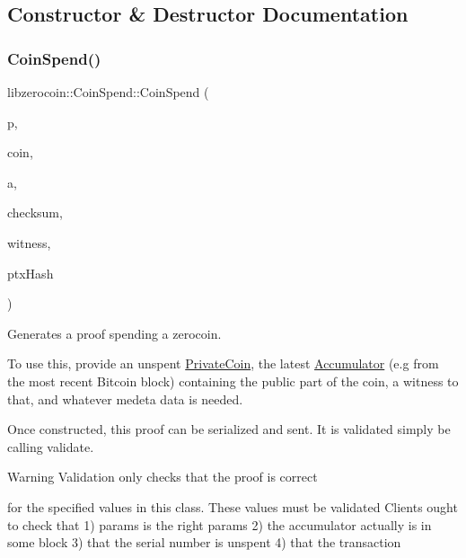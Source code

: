 \subsection{Constructor \& Destructor Documentation}
\mbox{\label{classlibzerocoin_1_1_coin_spend_ab26a001c08285be91ca2bf1d310d3cd6}} 
\subsubsection{\texorpdfstring{Coin\+Spend()}{CoinSpend()}}
{\footnotesize\ttfamily libzerocoin\+::\+Coin\+Spend\+::\+Coin\+Spend (\begin{DoxyParamCaption}\item[{const \mbox{\hyperlink{classlibzerocoin_1_1_zerocoin_params}{Zerocoin\+Params}} $\ast$}]{p,  }\item[{const \mbox{\hyperlink{classlibzerocoin_1_1_private_coin}{Private\+Coin}} \&}]{coin,  }\item[{\mbox{\hyperlink{classlibzerocoin_1_1_accumulator}{Accumulator}} \&}]{a,  }\item[{const uint32\+\_\+t}]{checksum,  }\item[{const \mbox{\hyperlink{classlibzerocoin_1_1_accumulator_witness}{Accumulator\+Witness}} \&}]{witness,  }\item[{const \mbox{\hyperlink{classuint256}{uint256}} \&}]{ptx\+Hash }\end{DoxyParamCaption})}

Generates a proof spending a zerocoin.

To use this, provide an unspent \mbox{\hyperlink{classlibzerocoin_1_1_private_coin}{Private\+Coin}}, the latest \mbox{\hyperlink{classlibzerocoin_1_1_accumulator}{Accumulator}} (e.\+g from the most recent Bitcoin block) containing the public part of the coin, a witness to that, and whatever medeta data is needed.

Once constructed, this proof can be serialized and sent. It is validated simply be calling validate. \begin{DoxyWarning}{Warning}
Validation only checks that the proof is correct 

for the specified values in this class. These values must be validated Clients ought to check that 1) params is the right params 2) the accumulator actually is in some block 3) that the serial number is unspent 4) that the transaction
\end{DoxyWarning}

